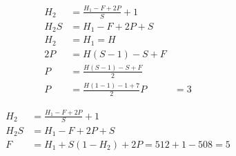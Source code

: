 \begin{align*}
    H_2 &= \frac{H_1 - F + 2P}{S} + 1 \\
    H_2S &= H_1 - F + 2P + S \\
    H_2 &= H_1 = H \\
    2P &= H(S - 1) - S + F \\
    P &= \frac{H(S - 1) - S + F}{2} \\
    P &= \frac{H(1-1) - 1 + 7}{2}
    P &= 3
\end{align*}


\begin{align*}
    H_2 &= \frac{H_1 - F + 2P}{S} + 1 \\
    H_2S &= H_1 - F + 2P + S \\
    F&= H_1 + S(1-H_2) + 2P = 512 + 1 - 508 = 5
\end{align*}